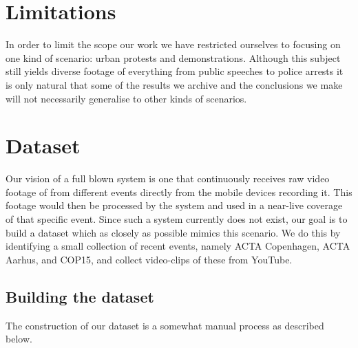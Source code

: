\section{Limitations}
%
%
%
%
%
In order to limit the scope our work we have restricted ourselves to focusing on one kind of scenario: urban protests and demonstrations. Although this subject still yields diverse footage of everything from public speeches to police arrests it is only natural that some of the results we archive and the conclusions we make will not necessarily generalise to other kinds of scenarios.
%
\section{Dataset}\label{sec:dataset}
%
Our vision of a full blown system is one that continuously receives raw video footage of from different events directly from the mobile devices recording it. This footage would then be processed by the system and used in a near-live coverage of that specific event. Since such a system currently does not exist, our goal is to build a dataset which as closely as possible mimics this scenario. We do this by identifying a small collection of recent events, namely ACTA Copenhagen, ACTA Aarhus, and COP15, and collect video-clips of these from YouTube.
%
\subsection{Building the dataset}
%
The construction of our dataset is a somewhat manual process as described below. %
%
